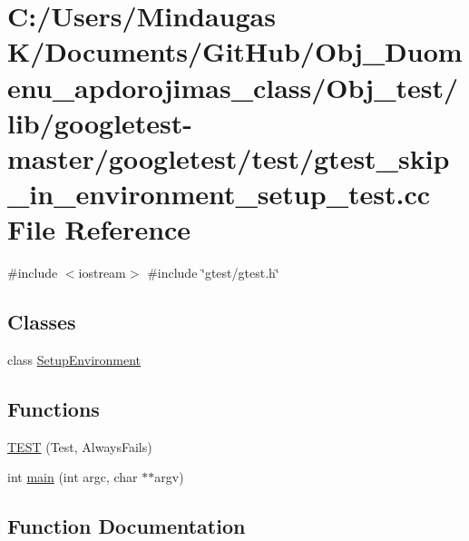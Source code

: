 \hypertarget{_obj__test_2lib_2googletest-master_2googletest_2test_2gtest__skip__in__environment__setup__test_8cc}{}\section{C\+:/\+Users/\+Mindaugas K/\+Documents/\+Git\+Hub/\+Obj\+\_\+\+Duomenu\+\_\+apdorojimas\+\_\+class/\+Obj\+\_\+test/lib/googletest-\/master/googletest/test/gtest\+\_\+skip\+\_\+in\+\_\+environment\+\_\+setup\+\_\+test.cc File Reference}
\label{_obj__test_2lib_2googletest-master_2googletest_2test_2gtest__skip__in__environment__setup__test_8cc}
{\ttfamily \#include $<$iostream$>$}\newline
{\ttfamily \#include \char`\"{}gtest/gtest.\+h\char`\"{}}\newline
\subsection*{Classes}
\begin{DoxyCompactItemize}
\item 
class \mbox{\hyperlink{class_setup_environment}{Setup\+Environment}}
\end{DoxyCompactItemize}
\subsection*{Functions}
\begin{DoxyCompactItemize}
\item 
\mbox{\hyperlink{_obj__test_2lib_2googletest-master_2googletest_2test_2gtest__skip__in__environment__setup__test_8cc_a30d5e724bb43125f507beb71b14dd782}{T\+E\+ST}} (Test, Always\+Fails)
\item 
int \mbox{\hyperlink{_obj__test_2lib_2googletest-master_2googletest_2test_2gtest__skip__in__environment__setup__test_8cc_a3c04138a5bfe5d72780bb7e82a18e627}{main}} (int argc, char $\ast$$\ast$argv)
\end{DoxyCompactItemize}


\subsection{Function Documentation}
\mbox{\label{_obj__test_2lib_2googletest-master_2googletest_2test_2gtest__skip__in__environment__setup__test_8cc_a3c04138a5bfe5d72780bb7e82a18e627}} 
